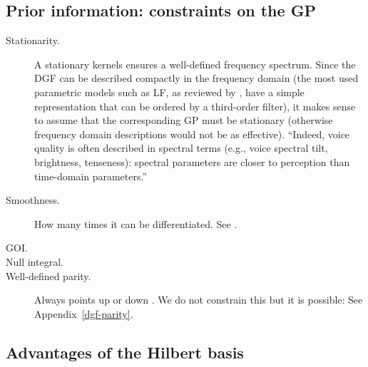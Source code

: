 \begin{chaptersections}
\section{Prior information: constraints on the GP}


\begin{description}
\item[Stationarity.]
A stationary kernels ensures a well-defined frequency spectrum.
Since the DGF can be described compactly in the frequency domain (the most used parametric models such as LF, as reviewed by \cite{Doval2006}, have a simple representation that can be ordered by a third-order filter), it makes sense to assume that the corresponding GP must be stationary (otherwise frequency domain descriptions would not be as effective).
``Indeed, voice quality is often described in spectral terms (e.g., voice spectral tilt, brightness, tenseness): spectral parameters are closer to perception than time-domain parameters.'' \citep[p.~1274]{Perrotin2021}
\item[Smoothness.]
How many times it can be differentiated. See \cite{Doval2006}.
\item[GOI.]
\item[Null integral.] 

\item[Well-defined parity.]
Always points up or down \citep{Chen2016}.
We do not constrain this but it is possible: See Appendix~\ref{dgf-parity}.
\end{description}

\subsection{Advantages of the Hilbert basis}


\end{chaptersections}
